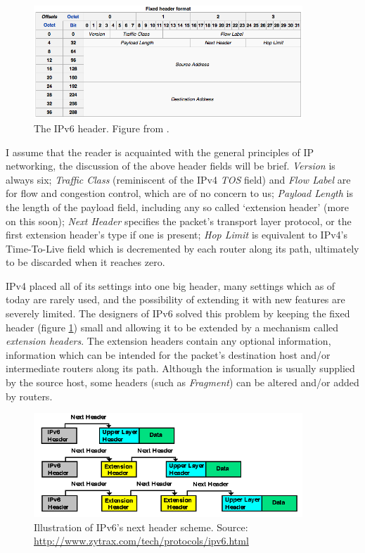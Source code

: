 \documentclass[final,a4paper,twoside,11pt,onecolumn]{report}
\begin{document}
\begin{figure}[here]
   \includegraphics[width=0.9\textwidth]{wiki-ipv6-header}
   \caption{The IPv6 header. Figure from \cite{wiki:ipv6_packet}.}
   \label{fig:ipv6_packet}
\end{figure}

I assume that the reader is acquainted with the general principles of IP networking, the discussion of the above header fields will be brief. \emph{Version} is always six; \emph{Traffic Class} (reminiscent of the IPv4 \emph{TOS} field) and \emph{Flow Label} are for flow and congestion control, which are of no concern to us; \emph{Payload Length} is the length of the payload field, including any so called `extension header' (more on this soon); \emph{Next Header} specifies the packet's transport layer protocol, or the first extension header's type if one is present; \emph{Hop Limit} is equivalent to IPv4's Time-To-Live field which is decremented by each router along its path, ultimately to be discarded when it reaches zero.

IPv4 placed all of its settings into one big header, many settings which as of today are rarely used, and the possibility of extending it with new features are severely limited. The designers of IPv6 solved this problem by keeping the fixed header (figure \ref{fig:ipv6_packet}) small and allowing it to be extended by a mechanism called \emph{extension headers}. The extension headers contain any optional information, information which can be intended for the packet's destination host and/or intermediate routers along its path. Although the information is usually supplied by the source host, some headers (such as \emph{Fragment}) can be altered and/or added by routers.

\begin{figure}[here]
   \centering
   \includegraphics[width=0.9\textwidth]{ipv6-nextheader}
   \caption{Illustration of IPv6's next header scheme. Source: \url{http://www.zytrax.com/tech/protocols/ipv6.html}}
   \label{fig:ipv6_nextheader}
\end{figure}
\end{document}
